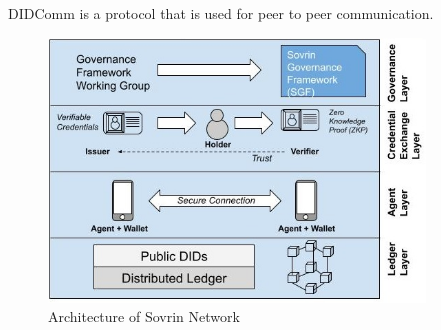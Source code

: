     DIDComm is a protocol that is used for peer to peer communication. 
    \begin{figure}
        
        \includegraphics[width=10cm]{images/ArchitectureOfSovrinNetwork.jpg}
        \centering
        \caption{Architecture of Sovrin Network}
        \label{fig:my_label}
    \end{figure}
    
        
    